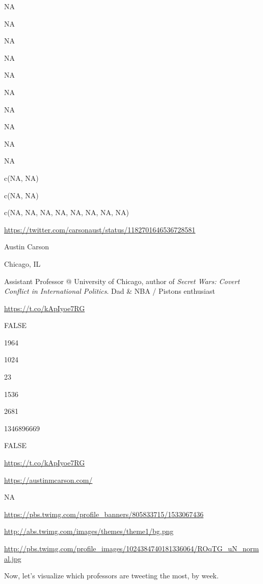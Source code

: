 \documentclass[]{book}
\newenvironment{Shaded}{\begin{snugshade}}{\end{snugshade}}
\newcommand{\DataTypeTok}[1]{\textcolor[rgb]{0.13,0.29,0.53}{#1}}
\newcommand{\KeywordTok}[1]{\textcolor[rgb]{0.13,0.29,0.53}{\textbf{#1}}}
\newcommand{\NormalTok}[1]{#1}
\newcommand{\OperatorTok}[1]{\textcolor[rgb]{0.81,0.36,0.00}{\textbf{#1}}}
\newcommand{\StringTok}[1]{\textcolor[rgb]{0.31,0.60,0.02}{#1}}
\begin{document}
NA

NA

NA

NA

NA

NA

NA

NA

NA

NA

c(NA, NA)

c(NA, NA)

c(NA, NA, NA, NA, NA, NA, NA, NA)

\url{https://twitter.com/carsonaust/status/1182701646536728581}

Austin Carson

Chicago, IL

Assistant Professor @ University of Chicago, author of \emph{Secret Wars: Covert Conflict in International Politics}. Dad \& NBA / Pistons enthusiast

\url{https://t.co/kApIyoe7RG}

FALSE

1964

1024

23

1536

2681

1346896669

FALSE

\url{https://t.co/kApIyoe7RG}

\url{https://austinmcarson.com/}

NA

\url{https://pbs.twimg.com/profile_banners/805833715/1533067436}

\url{http://abs.twimg.com/images/themes/theme1/bg.png}

\url{http://pbs.twimg.com/profile_images/1024384740181336064/ROqTG_uN_normal.jpg}

Now, let's visualize which professors are tweeting the most, by week.

\begin{Shaded}
\end{Shaded}
\end{document}
